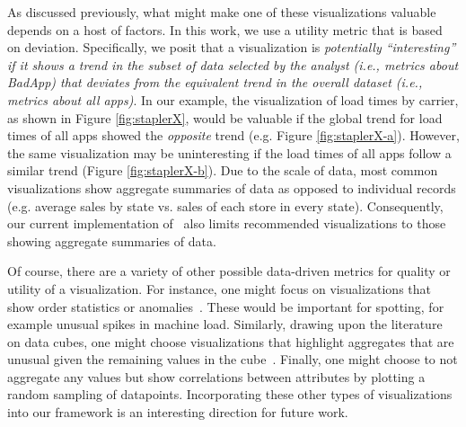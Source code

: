 As discussed previously, what might make one of these visualizations valuable depends on a host of factors.
In this work, we use a utility metric that is based on deviation.
Specifically, we posit that a visualization is {\em potentially ``interesting'' if it shows 
a trend in the subset of data selected by the analyst
(i.e., metrics about BadApp)
that deviates from the equivalent trend in the overall dataset (i.e., metrics
about all apps)}.
In our example, the visualization of load times by carrier, as shown in Figure
\ref{fig:staplerX}, would be valuable if the global trend for load times of all
apps showed the {\it opposite} trend (e.g. Figure \ref{fig:staplerX-a}).
However, the same visualization may be uninteresting if the load times of all apps
follow a similar trend (Figure \ref{fig:staplerX-b}).
Due to the scale of data, most common visualizations show aggregate summaries of data
as opposed to individual records (e.g. average sales by state vs. sales of each store 
in every state).
Consequently, our current implementation of \SeeDB\ also limits recommended visualizations to those showing aggregate 
summaries of data.

Of course, there are a variety of other possible data-driven metrics for  quality or utility
of a visualization.
For instance, one might focus on visualizations that show order statistics or anomalies~\cite{kandel}. 
These would be important for spotting, for example unusual spikes in machine load.
Similarly, drawing upon the literature on data cubes, one might choose visualizations that highlight aggregates that
are unusual given the remaining values in the cube~\cite{sarawagi}.
Finally, one might choose to not aggregate any values but show correlations between attributes by plotting a random
sampling of datapoints.  Incorporating these other types of visualizations into our framework is an interesting
direction for future work.

